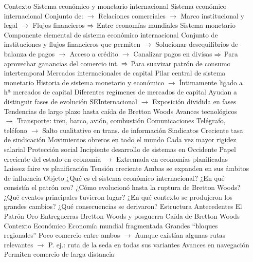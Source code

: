 \documentclass{nuevotema}
\begin{document}
\begin{esquemal}
	\1[] 
		\2 Contexto
			\3 Sistema económico y monetario internacional
				\4 Sistema económico internacional
				\4[] Conjunto de:
				\4[] $\to$ Relaciones comerciales
				\4[] $\to$ Marco institucional y legal
				\4[] $\to$ Flujos financieros
				\4[] $\Rightarrow$ Entre economías mundiales
				\4 Sistema monetario
				\4[] Componente elemental de sistema económico internacional
				\4[] Conjunto de instituciones y flujos financieros que permiten
				\4[] $\to$ Solucionar desequilibrios de balanza de pagos
				\4[] $\to$ Acceso a crédito
				\4[] $\to$ Canalizar pagos en divisas
				\4[] $\Rightarrow$ Para aprovechar ganancias del comercio int.
				\4[] $\Rightarrow$ Para suavizar patrón de consumo intertemporal
			\3 Mercados internacionales de capital
				\4 Pilar central de sistema monetario
				\4 Historia de sistema monetario y económico
				\4[] $\to$ Íntimamente ligado a hª mercados de capital
				\4 Diferentes regímenes de mercados de capital
				\4[] Ayudan a distinguir fases de evolución SEInternacional
				\4[] $\to$ Exposición dividida en fases
			\3 Tendencias de largo plazo hasta caída de Bretton Woods
				\4 Avances tecnológicos
				\4[] $\to$ Transporte: tren, barco, avión, combustión
				\4 Comunicaciones
				\4[] Telégrafo, teléfono
				\4[] $\to$ Salto cualitativo en trans. de información
				\4 Sindicatos
				\4[] Creciente tasa de sindicación
				\4[] Movimientos obreros en todo el mundo
				\4[] Cada vez mayor rigidez salarial
				\4 Protección social
				\4[] Incipiente desarrollo de sistemas en Occidente
				\4[] Papel creciente del estado en economía
				\4[] $\to$ Extremada en economías planificadas
				\4 Laissez faire vs planificación
				\4[] Tensión creciente
				\4[] Ambas se expanden en sus ámbitos de influencia
		\2 Objeto
			\3 ¿Qué es el sistema económico internacional?
			\3 ¿En qué consistía el patrón oro?
			\3 ¿Cómo evolucionó hasta la ruptura de Bretton Woods?
			\3 ¿Qué eventos principales tuvieron lugar?
			\3 ¿En qué contexto se produjeron los grandes cambios?
			\3 ¿Qué consecuencias se derivaron?
		\2 Estructura
			\3 Antecedentes
			\3 El Patrón Oro
			\3 Entreguerras
			\3 Bretton Woods y posguerra
			\3 Caída de Bretton Woods
	\1 
		\2 Contexto
			\3 Económico
				\4 Economía mundial fragmentada
				\4[] Grandes ``bloques regionales''
				\4[] Poco comercio entre ambos
				\4[] $\to$ Aunque existían algunas rutas relevantes
				\4[] $\to$ P. ej.: ruta de la seda en todas sus variantes
				\4 Avances en navegación
				\4[] Permiten comercio de larga distancia

\end{esquemal}
\end{document}
